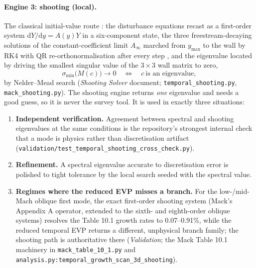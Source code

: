 \documentclass[11pt]{article}
\begin{document}
\paragraph{Engine 3: shooting (local).} The classical initial-value route
\cite{mack1984,ozgen2008}: the disturbance equations recast as a first-order system
$\mathrm dY/\mathrm dy=A(y)Y$ in a six-component state, the three freestream-decaying solutions
of the constant-coefficient limit $A_\infty$ marched from $y_{\max}$ to the wall by RK4 with QR
re-orthonormalisation after every step \cite{conte1966}, and the eigenvalue located by driving
the smallest singular value of the $3\times3$ wall matrix to zero,
\begin{equation}\label{eq:sigmamin}
  \sigma_{\min}\big(M(c)\big)\to0\quad\Longleftrightarrow\quad c\ \text{is an eigenvalue},
\end{equation}
by Nelder--Mead search \cite{neldermead1965} (\emph{Shooting Solver} document;
\texttt{temporal\_shooting.py}, \texttt{mack\_shooting.py}). The shooting engine returns
\emph{one} eigenvalue and needs a good guess, so it is never the survey tool. It is used in
exactly three situations:
\begin{enumerate}[nosep,leftmargin=1.8em]
  \item \textbf{Independent verification.} Agreement between spectral and shooting eigenvalues
        at the same conditions is the repository's strongest internal check that a mode is
        physics rather than discretisation artifact
        (\texttt{validation/test\_temporal\_shooting\_cross\_check.py}).
  \item \textbf{Refinement.} A spectral eigenvalue accurate to discretisation error is polished
        to tight tolerance by the local search seeded with the spectral value.
  \item \textbf{Regimes where the reduced EVP misses a branch.} For the low-/mid-Mach oblique
        first mode, the exact first-order shooting system (Mack's Appendix A operator, extended
        to the sixth- and eighth-order oblique systems) resolves the Table 10.1 growth rates to
        0.07--0.91\%, while the reduced temporal EVP returns a different, unphysical branch
        family; the shooting path is authoritative there (\emph{Validation}; the Mack Table 10.1
        machinery in \texttt{mack\_table\_10\_1.py} and
        \texttt{analysis.py:temporal\_growth\_scan\_3d\_shooting}).
\end{enumerate}
\end{document}
